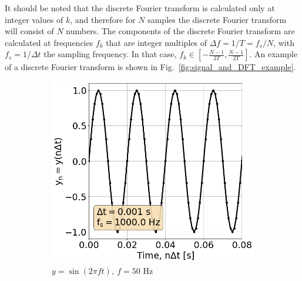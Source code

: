It should be noted that the discrete Fourier transform is calculated only at integer values of $k$, and therefore for $N$ samples the discrete Fourier transform will consist of $N$ numbers. The components of the discrete Fourier transform are calculated at frequencies $f_k$ that are integer multiples of $\Delta f = 1/T = f_s/N$, with $f_s = 1/\Delta t$ the sampling frequency. In that case, $f_k \in \left[-\frac{N-1}{2T},\frac{N-1}{2T} \right]$. An example of a discrete Fourier transform is shown in Fig.~\ref{fig:signal_and_DFT_example}.
\begin{figure}[!ht]
    \centering
    \begin{subfigure}[t]{0.45\textwidth}
        \centering
        \includegraphics[width=1\textwidth]{./images/app_B/simple_signal_1freq_example.png}
        \caption{$y=\sin(2 \pi f t),\ f=50$ Hz}
        \label{fig:signal_and_DFT_example_a}
    \end{subfigure}
    \hfill
    \begin{subfigure}[t]{0.45\textwidth}
        \centering

\end{subfigure}
\end{figure}
